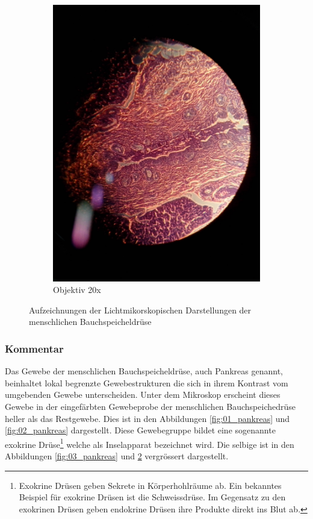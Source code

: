 \begin{figure}[h!]
\begin{subfigure}[b]{0.3\textwidth}
		\includegraphics[width=1\textwidth]{../images/04_pankreas.jpg}
		\caption{Objektiv 20x}
		\label{fig:04_pankreas}
	\end{subfigure}
	\caption{Aufzeichnungen der Lichtmikorskopischen Darstellungen der
		menschlichen Bauchspeicheldrüse}
\end{figure}

\subsubsection{Kommentar}
Das Gewebe der menschlichen Bauchspeicheldrüse, auch Pankreas genannt,
beinhaltet lokal begrenzte Gewebestrukturen die sich in ihrem Kontrast vom
umgebenden Gewebe unterscheiden. Unter dem Mikroskop erscheint dieses Gewebe
in der eingefärbten Gewebeprobe der menschlichen Bauchspeichedrüse heller als
das Restgewebe. Dies ist in den Abbildungen \ref{fig:01_pankreas} und
\ref{fig:02_pankreas} dargestellt. Diese Gewebegruppe bildet eine sogenannte
exokrine Drüse\footnote{Exokrine Drüsen geben Sekrete in Körperhohlräume ab.
Ein bekanntes Beispiel für exokrine Drüsen ist die Schweissdrüse. Im Gegensatz
zu den exokrinen Drüsen geben endokrine Drüsen ihre Produkte direkt ins Blut
ab.} welche als Inselapparat bezeichnet wird. Die selbige ist in den
Abbildungen \ref{fig:03_pankreas} und \ref{fig:04_pankreas} vergrössert
dargestellt.

